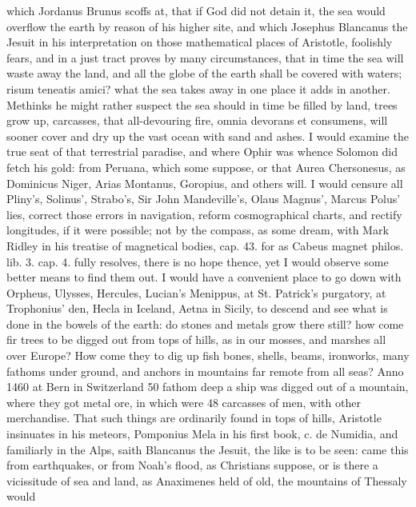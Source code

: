 {which Jordanus Brunus scoffs at, that if God did not detain it, the sea
would overflow the earth by reason of his higher site, and which
Josephus Blancanus the Jesuit in his interpretation on those
mathematical places of Aristotle, foolishly fears, and in a just tract
proves by many circumstances, that in time the sea will waste away the
land, and all the globe of the earth shall be covered with waters;
risum teneatis amici? what the sea takes away in one place it adds in
another. Methinks he might rather suspect the sea should in time be
filled by land, trees grow up, carcasses, \etc{} that all-devouring fire,
omnia devorans et consumens, will sooner cover and dry up the vast
ocean with sand and ashes. I would examine the true seat of that
terrestrial paradise, and where Ophir was whence Solomon did
fetch his gold: from Peruana, which some suppose, or that Aurea
Chersonesus, as Dominicus Niger, Arias Montanus, Goropius, and others
will. I would censure all Pliny's, Solinus', Strabo's, Sir John
Mandeville's, Olaus Magnus', Marcus Polus' lies, correct those errors
in navigation, reform cosmographical charts, and rectify longitudes, if
it were possible; not by the compass, as some dream, with Mark Ridley
in his treatise of magnetical bodies, cap. 43. for as Cabeus magnet
philos. lib. 3. cap. 4. fully resolves, there is no hope thence, yet I
would observe some better means to find them out.
I would have a convenient place to go down with Orpheus, Ulysses,
Hercules, Lucian's Menippus, at St. Patrick's purgatory, at
Trophonius' den, Hecla in Iceland, Aetna in Sicily, to descend and see
what is done in the bowels of the earth: do stones and metals grow
there still? how come fir trees to be digged out from tops of
hills, as in our mosses, and marshes all over Europe? How come they to
dig up fish bones, shells, beams, ironworks, many fathoms under ground,
and anchors in mountains far remote from all seas? Anno 1460 at
Bern in Switzerland 50 fathom deep a ship was digged out of a mountain,
where they got metal ore, in which were 48 carcasses of men, with other
merchandise. That such things are ordinarily found in tops of hills,
Aristotle insinuates in his meteors, Pomponius Mela in his first
book, c. de Numidia, and familiarly in the Alps, saith Blancanus
the Jesuit, the like is to be seen: came this from earthquakes, or from
Noah's flood, as Christians suppose, or is there a vicissitude of sea
and land, as Anaximenes held of old, the mountains of Thessaly would
}
